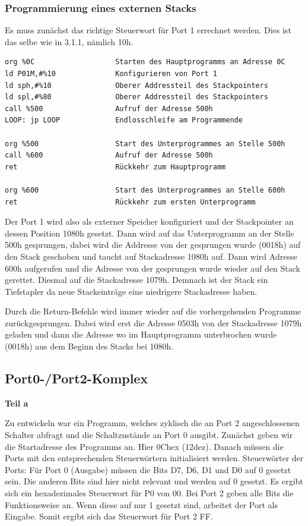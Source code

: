 \subsubsection{Programmierung eines externen Stacks}

Es muss zunächst das richtige Steuerwort für Port 1 errechnet werden. Dies ist das selbe wie in 3.1.1, nämlich 10h.

\begin{verbatim}
org %0C                   Starten des Hauptprogramms an Adresse 0C
ld P01M,#%10              Konfigurieren von Port 1
ld sph,#%10               Oberer Addressteil des Stackpointers
ld spl,#%80               Oberer Addressteil des Stackpointers
call %500                 Aufruf der Adresse 500h
LOOP: jp LOOP             Endlosschleife am Programmende

org %500                  Start des Unterprogrammes an Stelle 500h
call %600                 Aufruf der Adresse 500h
ret                       Rückkehr zum Hauptprogramm

org %600                  Start des Unterprogrammes an Stelle 600h
ret                       Rückkehr zum ersten Unterprogramm
\end{verbatim}

Der Port 1 wird also als externer Speicher konfiguriert und der Stackpointer an dessen Position 1080h gesetzt. Dann wird auf das Unterprogramm an der Stelle 500h gesprungen, dabei wird die Addresse von der gesprungen wurde (0018h) auf den Stack geschoben und taucht  auf Stackadresse 1080h auf. Dann wird Adresse 600h aufgerufen und die Adresse von der gesprungen wurde wieder auf den Stack gerettet. Diesmal auf die Stackadresse 1079h. Demnach ist der Stack ein Tiefstapler da neue Stackeinträge eine niedrigere Stackadresse haben.

Durch die Return-Befehle wird immer wieder auf die vorhergehenden Programme zurückgesprungen. Dabei wird erst die Adresse 0503h von der Stackadresse 1079h geladen und dann die Adresse wo im Hauptprogramm unterbrochen wurde (0018h) aus dem Beginn des Stacks bei 1080h.

\newpage


\subsection{Port0-/Port2-Komplex}

\textbf{Teil a}

Zu entwickeln war ein Programm, welches zyklisch die an Port 2 angeschlossenen Schalter abfragt und die Schaltzustände an Port 0 ausgibt.
Zunächst geben wir die Startadresse des Programms an. Hier 0Chex (12dez). Danach müssen die Ports mit den entsprechenden Steuerwörtern initialisiert werden.
Steuerwörter der Ports:
Für Port 0 (Ausgabe) müssen die Bits D7, D6, D1 und D0 auf 0 gesetzt sein. Die anderen Bits sind hier nicht relevant und werden auf 0 gesetzt. Es ergibt sich ein hexadezimales Steuerwort für P0 von 00. Bei Port 2 geben alle Bits die Funktionsweise an. Wenn diese auf nur 1 gesetzt sind, arbeitet der Port als Eingabe. Somit ergibt sich das Steuerwort für Port 2 FF.

